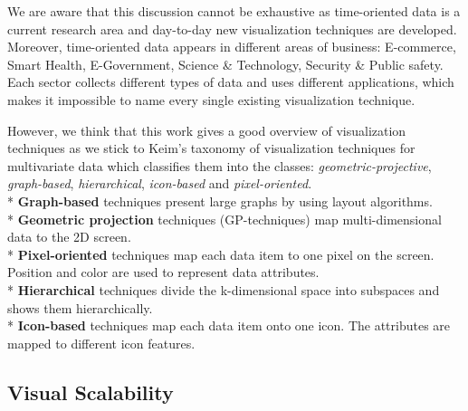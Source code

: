 We are aware that this discussion cannot be exhaustive as time-oriented data is a current research area and day-to-day new visualization techniques are developed.
Moreover, time-oriented data appears in different areas of business: E-commerce, Smart Health, E-Government, Science \& Technology, Security \& Public safety. Each sector collects different types of data and uses different applications, which makes it impossible to name every single existing visualization technique.


However, we think that this work gives a good overview of visualization techniques as we stick to Keim's taxonomy\cite{Keim1995} of visualization techniques for multivariate data which classifies them into the classes: \textit{geometric-projective}, \textit{graph-based}, \textit{hierarchical}, \textit{icon-based} and \textit{pixel-oriented}.
\\*
\textbf{Graph-based} techniques present large graphs by using layout algorithms\cite{Keim1996}.\\*
\textbf{Geometric projection} techniques (GP-techniques) map multi-dimensional data to the 2D screen\cite{FerreiradeOliveira2003}.\\*
\textbf{Pixel-oriented} techniques map each data item to one pixel on the screen. Position and color are used to represent data attributes\cite{Keim1996}.\\*
\textbf{Hierarchical} techniques divide the k-dimensional space into subspaces and shows them hierarchically. \\*
\textbf{Icon-based} techniques map each data item onto one icon. The attributes are mapped to different icon features\cite{Keim2001}.

\subsection{Visual Scalability}\label{scalability}

